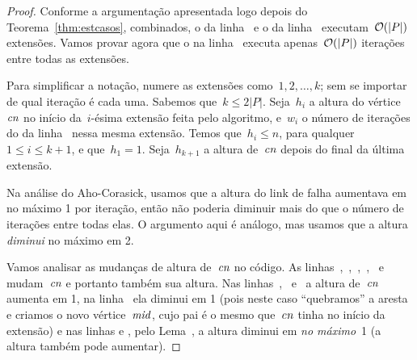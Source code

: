 \begin{proof}
Conforme a argumentação apresentada logo depois do Teorema~\ref{thm:estcasos}, combinados, o  da linha~ e o  da linha~ executam~$\mathcal{O}(|P|)$ extensões. Vamos provar agora que o  na linha~ executa apenas~$\mathcal{O}(|P|)$ iterações entre todas as extensões.

Para simplificar a notação, numere as extensões como~$1, 2, \ldots, k$; sem se importar de qual iteração é cada uma. Sabemos que~$k \leq 2|P|$. Seja~$h_i$ a altura do vértice~$\mathit{cn}$ no início da~$i$-ésima extensão feita pelo algoritmo, e~$w_i$ o número de iterações do  da linha~ nessa mesma extensão. Temos que~$h_i \leq n$, para qualquer~$1 \leq i \leq k+1$, e que~$h_1 =1$. Seja~$h_{k+1}$ a altura de~$\mathit{cn}$ depois do final da última extensão.

Na análise do Aho-Corasick, usamos que a altura do link de falha aumentava em no máximo 1 por iteração, então não poderia diminuir mais do que o número de iterações entre todas elas. O argumento aqui é análogo, mas usamos que a altura \emph{diminui} no máximo em 2.

Vamos analisar as mudanças de altura de~$\mathit{cn}$ no código. As linhas~,~,~,~,~ e~ mudam~$\mathit{cn}$ e portanto também sua altura. Nas linhas~,~ e~ a altura de~$\mathit{cn}$ aumenta em 1, na linha~ ela diminui em 1 (pois neste caso ``quebramos'' a aresta e criamos o novo vértice~$\mathit{mid}$, cujo pai é o mesmo que~$\mathit{cn}$ tinha no início da extensão) e nas linhas  e , pelo Lema~, a altura diminui em \emph{no máximo}~1 (a altura também pode aumentar).


\end{proof}
